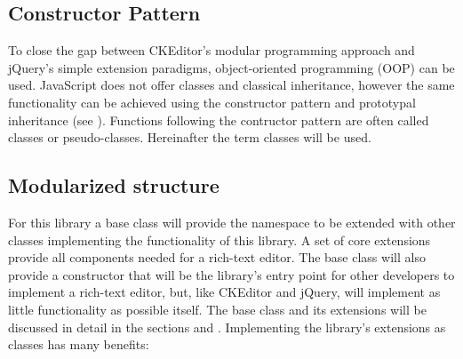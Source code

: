 

\subsection{Constructor Pattern} To close the gap between CKEditor's modular programming approach and jQuery's simple extension paradigms, object-oriented programming (OOP) can be used. JavaScript does not offer classes and classical inheritance, however the same functionality can be achieved using the constructor pattern and prototypal inheritance (see ). Functions following the contructor pattern are often called classes or pseudo-classes. Hereinafter the term classes will be used.

%
%
%




\subsection{Modularized structure} For this library a base class will provide the namespace to be extended with other classes implementing the functionality of this library. A set of core extensions provide all components needed for a rich-text editor. The base class will also provide a constructor that will be the library's entry point for other developers to implement a rich-text editor, but, like CKEditor and jQuery, will implement as little functionality as possible itself. The base class and its extensions will be discussed in detail in the sections  and . Implementing the library's extensions as classes has many benefits:

